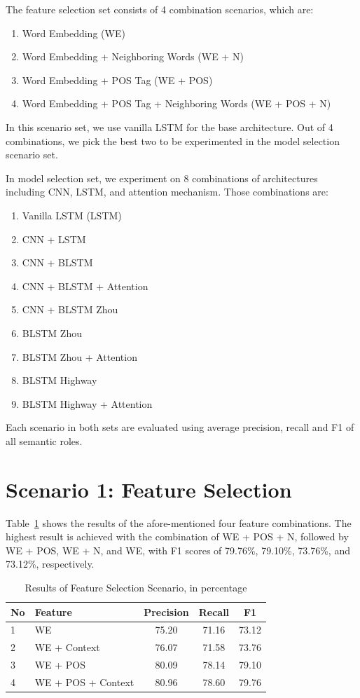 The feature selection set consists of 4 combination scenarios, which are:
\begin{enumerate}
	\item Word Embedding (WE)
	\item Word Embedding + Neighboring Words (WE + N)
	\item Word Embedding + POS Tag (WE + POS)
	\item Word Embedding + POS Tag + Neighboring Words (WE + POS + N)
\end{enumerate}

In this scenario set, we use vanilla LSTM for the base architecture. Out of 4 combinations, we pick the best two to be experimented in the model selection scenario set.

In model selection set, we experiment on 8 combinations of architectures including CNN, LSTM, and attention mechanism. Those combinations are:
\begin{enumerate}
	\item Vanilla LSTM (LSTM)
	\item CNN + LSTM
	\item CNN + BLSTM
	\item CNN + BLSTM + Attention
	\item CNN + BLSTM Zhou
	\item BLSTM Zhou
	\item BLSTM Zhou + Attention
	\item BLSTM Highway
	\item BLSTM Highway + Attention
\end{enumerate}

Each scenario in both sets are evaluated using average precision, recall and F1 of all semantic roles.

\section{Scenario 1: Feature Selection}
Table~\ref{tab:feature_scenario} shows the results of the afore-mentioned four feature combinations. The highest result is achieved with the combination of WE + POS + N, followed by WE + POS, WE + N, and WE, with F1 scores of 79.76\%, 79.10\%, 73.76\%, and 73.12\%, respectively. 

\begin{table}
	\centering
	\caption{Results of Feature Selection Scenario, in percentage}
	\label{tab:feature_scenario}
	\begin{tabular}{llccc}
		\hline
		No & Feature & Precision & Recall & F1 \\
		\hline\hline
		1 & WE & 75.20 & 71.16 & 73.12 \\
		2 & WE + Context & 76.07 & 71.58 & 73.76 \\
		3 & WE + POS & 80.09 & 78.14 & 79.10 \\
		4 & WE + POS + Context & 80.96 & 78.60 & 79.76 \\
		\hline
	\end{tabular}

\end{table}

